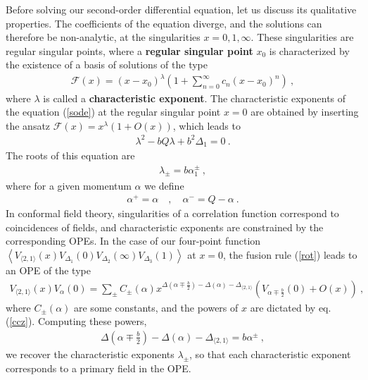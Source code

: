 \documentclass[12pt,a4paper,notitlepage]{report}
\newcommand \la {\left\langle}
\newcommand \ra {\right\rangle}
\numberwithin{equation}{section}
\theoremstyle{break}
\begin{document}
Before solving our second-order differential equation, let us discuss its qualitative properties. The coefficients of the equation diverge, and the solutions can therefore be non-analytic, at the singularities $x=0,1,\infty$. These singularities are regular singular points, where a \textbf{regular singular point} $x_0$ is characterized by the existence of a basis of solutions of the type  
\begin{align}
 \mathcal{F}(x)=(x-x_0)^\lambda\left(1+\sum_{n=0}^\infty c_n (x-x_0)^n\right)\ ,
\label{zxl}
\end{align}
where $\lambda$ is called a \textbf{\boldmath characteristic exponent}. The characteristic exponents of the equation (\ref{sode}) at the regular singular point $x=0$ are obtained by inserting the ansatz $\mathcal{F}(x) = x^\lambda(1+O(x))$, which leads to 
\begin{align}
 \lambda^2 - bQ\lambda + b^2 \Delta_1 = 0 \ .
\end{align}
The roots of this equation are 
\begin{align}
 \lambda_\pm = b\alpha_1^\pm \ , 
\label{lpm}
\end{align}
where for a given momentum $\alpha$ we define 
\begin{align}
 \alpha^+ = \alpha \quad , \quad \alpha^- = Q-\alpha\ .
\label{apm}
\end{align}
In conformal field theory, singularities of a correlation function correspond to coincidences of fields, and characteristic exponents are constrained by the corresponding OPEs. In the case of our four-point function $\la V_{\langle 2,1 \rangle}(x)V_{\Delta_1}(0)V_{\Delta_2}(\infty)V_{\Delta_3}(1)\ra$ at $x=0$, the fusion rule (\ref{rot}) leads to an OPE of the type
\begin{align}
 V_{\langle 2,1 \rangle}(x)V_{\alpha}(0) = \sum_\pm C_\pm(\alpha) x^{\Delta\left(\alpha\mp \frac{b}{2}\right) -\Delta(\alpha) - \Delta_{\langle 2,1 \rangle}} \left(V_{\alpha\mp\frac{b}{2}}(0) + O(x)\right)\ ,
\end{align}
where $C_\pm(\alpha)$ are some constants, and the powers of $x$ are dictated by eq. (\ref{ccz}). 
Computing these powers,
\begin{align}
 \Delta\left(\alpha\mp \frac{b}{2}\right) -\Delta(\alpha) - \Delta_{\langle 2,1 \rangle}  = b \alpha^{\pm}\ ,
\end{align}
we recover the characteristic exponents $\lambda_\pm$, so that each characteristic exponent corresponds to a primary field in the OPE.
\end{document}
